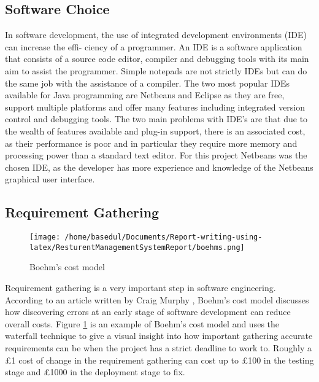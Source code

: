 \documentclass[12pt,a4paper]{article}
\begin{document}
	\subsection{Software Choice}
		In software development, the use of integrated development environments (IDE) can increase the effi-
ciency of a programmer. An IDE is a software application that consists of a source code editor, compiler
and debugging tools with its main aim to assist the programmer. Simple notepads are not strictly IDEs
but can do the same job with the assistance of a compiler.
The two most popular IDEs available for Java programming are Netbeans and Eclipse as they
are free, support multiple platforms and offer many features including integrated version control and
debugging tools. The two main problems with IDE’s are that due to the wealth of features available
and plug-in support, there is an associated cost, as their performance is poor and in particular they
require more memory and processing power than a standard text editor.
For this project Netbeans was the chosen IDE, as the developer has more experience and knowledge
of the Netbeans graphical user interface.
\subsection{Requirement Gathering}
	\label{sec:gather}
	\begin{figure}
		\centering
		\texttt{[image: /home/basedul/Documents/Report-writing-using-latex/ResturentManagementSystemReport/boehms.png]}
		\caption{Boehm's cost model \cite{RefWorks:1}}
		\label{fig:req} 
	\end{figure}
	Requirement gathering is a very important step in software engineering. According to an article written
by Craig Murphy \cite{RefWorks:1}, Boehm’s cost model discusses how discovering errors at an early stage of software
development can reduce overall costs. Figure \ref{fig:req} is an example of Boehm’s cost model and uses the
waterfall technique to give a visual insight into how important gathering accurate requirements can be when the project has a strict deadline to work to. Roughly a £1 cost of change in the requirement
gathering can cost up to £100 in the testing stage and £1000 in the deployment stage to fix.
\newpage
\end{document}

